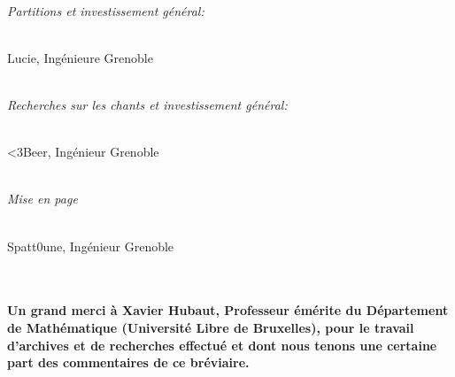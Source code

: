 \documentclass[a5paper,twoside,openright]{article} %
\begin{document}
\\\textit{Partitions et investissement général:}
\begin{addmargin}[1em]{2em}%
\\Lucie{\color{falGrey!60!black}, Ingénieure Grenoble}\\
\end{addmargin}

\\\textit{Recherches sur les chants et investissement général:}
\begin{addmargin}[1em]{2em}%
\\<3Beer{\color{falGrey!60!black}, Ingénieur Grenoble}\\
\end{addmargin}

\\\textit{Mise en page}
\begin{addmargin}[1em]{2em}%
\\Spatt0une{\color{falGrey!60!black}, Ingénieur Grenoble}\\
\end{addmargin}

\\\\\textbf{Un grand merci à Xavier Hubaut, Professeur émérite du Département de Mathématique (Université Libre de Bruxelles), pour le travail d'archives et de recherches effectué et dont nous tenons une certaine part des commentaires de ce bréviaire.}
\end{document}
